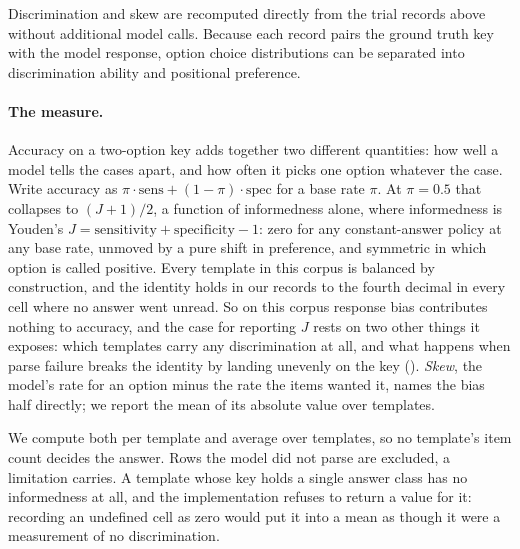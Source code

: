 Discrimination and skew are recomputed directly from the trial records above
without additional model calls. Because each record pairs the ground truth key
with the model response, option choice distributions can be separated into
discrimination ability and positional preference.

\paragraph{The measure.} Accuracy on a two-option key adds together two
different quantities: how well a model tells the cases apart, and how often it
picks one option whatever the case. Write accuracy as
$\pi \cdot \mathrm{sens} + (1 - \pi) \cdot \mathrm{spec}$ for a base rate
$\pi$. At $\pi = 0.5$ that collapses to $(J + 1)/2$, a function of
informedness alone, where informedness is Youden's
$J = \mathrm{sensitivity} + \mathrm{specificity} - 1$: zero for any
constant-answer policy at any base rate, unmoved by a pure shift in
preference, and symmetric in which option is called positive. Every template
in this corpus is balanced by construction, and the identity holds in our
records to the fourth decimal in every cell where no answer went unread. So on
this corpus response bias contributes nothing to accuracy, and the case for
reporting $J$ rests on two other things it exposes: which templates carry any
discrimination at all, and what happens when parse failure breaks the
identity by landing unevenly on the key (). \emph{Skew},
the model's rate for an option minus the rate the items wanted it, names the
bias half directly; we report the mean of its absolute value over templates.

We compute both per template and average over templates, so no template's item
count decides the answer. Rows the model did not parse are excluded, a
limitation  carries. A template whose key holds a single
answer class has no informedness at all, and the implementation refuses to
return a value for it: recording an undefined cell as zero would put it into a
mean as though it were a measurement of no discrimination.

\begin{table}[htbp]
\centering
\signalTable
\caption{Discrimination by arm, with cluster-bootstrap intervals resampling
templates. Parse rate is the share of readings that produced a readable
answer; everything else is computed over that subset.}
\label{tab:signal}
\end{table}

